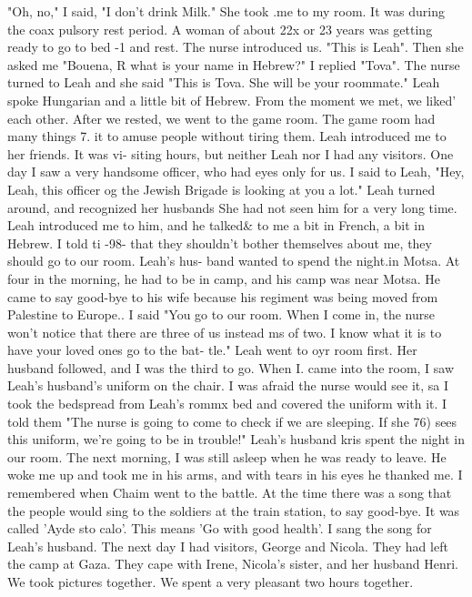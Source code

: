 "Oh, no," I said, "I don't drink Milk." She took .me to my room. It was during the coax{ 
pulsory rest period. A woman of about 22x or 23 years was getting ready to go to bed -1 
and rest. The nurse introduced us. "This is Leah". Then she asked me "Bouena, R what 
is your name in Hebrew?" I replied "Tova". The nurse turned to Leah and she said 
"This is Tova. She will be your roommate." 
Leah spoke Hungarian and a little bit of Hebrew. From the moment we met, we liked' 
each other. After we rested, we went to the game room. The game room had many things 7. 
it to amuse people without tiring them. Leah introduced me to her friends. It was vi-
siting hours, but neither Leah nor I had any visitors. 
One day I saw a very handsome officer, who had eyes only for us. I said to Leah, 
"Hey, Leah, this officer og the Jewish Brigade is looking at you a lot." Leah turned 
around, and recognized her husbands She had not seen him for a very long time. Leah 
introduced me to him, and he talked& to me a bit in French, a bit in Hebrew. I told ti 
-98- 
that they shouldn't bother themselves about me, they should go to our room. Leah's hus-
band wanted to spend the night.in Motsa. At four in the morning, he had to be in camp, 
and his camp was near Motsa. He came to say good-bye to his wife because his regiment 
was being moved from Palestine to Europe.. 
I said "You go to our room. When I come in, the nurse won't notice that there are 
three of us instead ms of two. I know what it is to have your loved ones go to the bat-
tle." Leah went to oyr room first. Her husband followed, and I was the third to go. 
When I. came into the room, I saw Leah's husband's uniform on the chair. I was afraid the 
nurse would see it, sa I took the bedspread from Leah's rommx bed and covered the uniform 
with it. I told them "The nurse is going to come to check if we are sleeping. If she 
76) 
sees this uniform, we're going to be in trouble!" 
Leah's husband kris spent the night in our room. The next morning, I was still asleep 
when he was ready to leave. He woke me up and took me in his arms, and with tears in his 
eyes he thanked me. I remembered when Chaim went to the battle. At the time there was 
a song that the people would sing to the soldiers at the train station, to say good-bye. 
It was called 'Ayde sto calo'. This means 'Go with good health'. I sang the song for 
Leah's husband. 
The next day I had visitors, George and Nicola. They had left the camp at Gaza. They 
cape with Irene, Nicola's sister, and her husband Henri. We took pictures together. We 
spent a very pleasant two hours together. 
}
